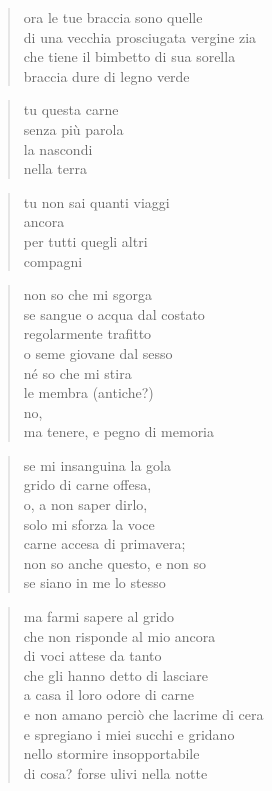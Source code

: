 \begin{verse}
    ora le tue braccia sono quelle\\
    di una vecchia prosciugata vergine zia\\
    che tiene il bimbetto di sua sorella\\
    braccia dure di legno verde
\end{verse}

\begin{verse}
    tu questa carne\\
    senza più parola\\
    la nascondi\\
    nella terra
\end{verse}

\begin{verse}
    tu non sai quanti viaggi\\
    ancora\\
    per tutti quegli altri\\
    compagni
\end{verse}

\clearpage


\begin{verse}
    non so che mi sgorga\\
    se sangue o acqua dal costato\\
    regolarmente trafitto\\
    o seme giovane dal sesso\\
    né so che mi stira\\
    le membra (antiche?)\\
    no,\\
    ma tenere, e pegno di memoria
\end{verse}

\begin{verse}
    se mi insanguina la gola\\
    grido di carne offesa,\\
    o, a non saper dirlo,\\
    solo mi sforza la voce\\
    carne accesa di primavera;\\
    non so anche questo, e non so\\
    se siano in me lo stesso
\end{verse}

\clearpage


\begin{verse}
    ma farmi sapere al grido\\
    che non risponde al mio ancora\\
    di voci attese da tanto\\
    che gli hanno detto di lasciare\\
    a casa il loro odore di carne\\
    e non amano perciò che lacrime di cera\\
    e spregiano i miei succhi e gridano\\
    nello stormire insopportabile\\
    di cosa? forse ulivi nella notte
\end{verse}

